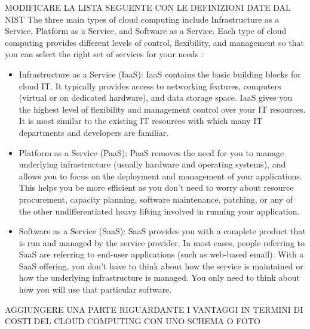 MODIFICARE LA LISTA SEGUENTE CON LE DEFINIZIONI DATE DAL NIST 
The three main types of cloud computing include Infrastructure as a Service, Platform as a Service, and Software as a Service. Each type of cloud computing provides different levels of control, flexibility, and management so that you can select the right set of services for your needs \cite{AWSWhatIsCloudComputing}:
\begin{itemize}
    \item Infrastructure as a Service (IaaS): IaaS contains the basic building blocks for cloud IT. It typically provides access to networking features, computers (virtual or on dedicated hardware), and data storage space. IaaS gives you the highest level of flexibility and management control over your IT resources. It is most similar to the existing IT resources with which many IT departments and developers are familiar. 
    \item Platform as a Service (PaaS): PaaS removes the need for you to manage underlying infrastructure (usually hardware and operating systems), and allows you to focus on the deployment and management of your applications. This helps you be more efficient as you don't need to worry about resource procurement, capacity planning, software maintenance, patching, or any of the other undifferentiated heavy lifting involved in running your application. 
    \item Software as a Service (SaaS): SaaS provides you with a complete product that is run and managed by the service provider. In most cases, people referring to SaaS are referring to end-user applications (such as web-based email). With a SaaS offering, you don't have to think about how the service is maintained or how the underlying infrastructure is managed. You only need to think about how you will use that particular software.
\end{itemize}


AGGIUNGERE UNA PARTE RIGUARDANTE I VANTAGGI IN TERMINI DI COSTI DEL CLOUD COMPUTING CON UNO SCHEMA O FOTO

